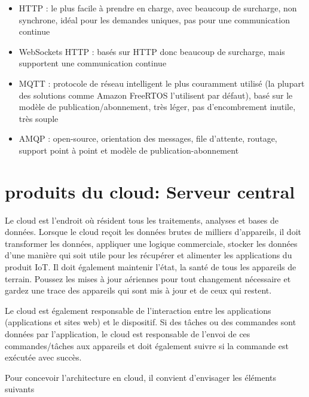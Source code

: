 \documentclass[12pt]{report}
\begin{document}
\begin{itemize}
      \item
            HTTP : le plus facile à prendre en charge, avec beaucoup de surcharge,
            non synchrone, idéal pour les demandes uniques, pas pour une
            communication continue
      \item
            WebSockets HTTP : basés sur HTTP donc beaucoup de surcharge, mais
            supportent une communication continue
      \item
            MQTT : protocole de réseau intelligent le plus couramment utilisé (la plupart des
            solutions comme Amazon FreeRTOS l'utilisent par défaut), basé sur le
            modèle de publication/abonnement, très léger, pas d'encombrement
            inutile, très souple
      \item
            AMQP : open-source, orientation des messages, file d'attente, routage,
            support point à point et modèle de publication-abonnement
\end{itemize}

\hypertarget{cloud-de-produits}{%
      \chapter{\texorpdfstring{produits du cloud: Serveur central
        }{produits du cloud : Serveur central }}\label{cloud-de-produits}}

Le cloud est l'endroit où résident tous les traitements, analyses et
bases de données. Lorsque le cloud reçoit les données brutes de milliers
d'appareils, il doit transformer les données, appliquer une logique
commerciale, stocker les données d'une manière qui soit utile pour les
récupérer et alimenter les applications du produit IoT. Il doit
également maintenir l'état, la santé de tous les appareils de terrain.
Poussez les mises à jour aériennes pour tout changement nécessaire et
gardez une trace des appareils qui sont mis à jour et de ceux qui
restent.

Le cloud est également responsable de l'interaction entre les
applications (applications et sites web) et le dispositif. Si des tâches
ou des commandes sont données par l'application, le cloud est
responsable de l'envoi de ces commandes/tâches aux appareils et doit
également suivre si la commande est exécutée avec succès.

Pour concevoir l'architecture en cloud, il convient d'envisager les
éléments suivants
\end{document}
